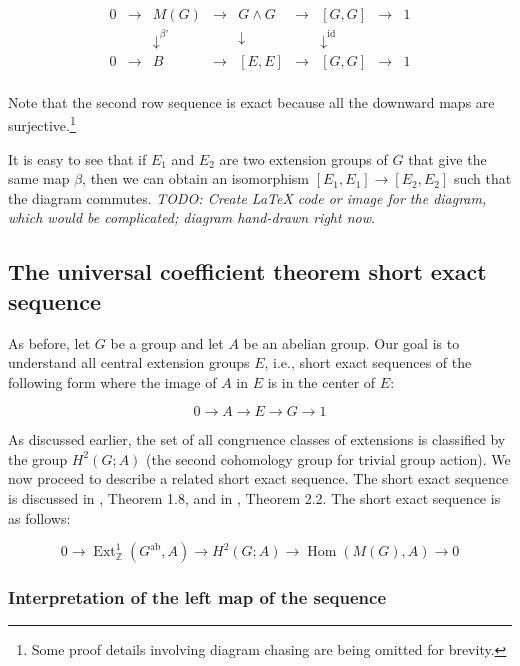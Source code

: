 \documentclass{ucetd}
\begin{document}
$$\begin{array}{ccccccccc}
0 & \to & M(G) & \to & G \wedge G & \to & [G,G] & \to & 1\\
 &&   \downarrow^{\beta'}  &&  \downarrow     && \downarrow^{\text{id}} && \\
0 & \to & B &\to & [E,E] & \to & [G,G] & \to & 1\\
\end{array}$$

Note that the second row sequence is exact because all the downward
maps are surjective.\footnote{Some proof details involving diagram
  chasing are being omitted for brevity.}

It is easy to see that if $E_1$ and $E_2$ are two
extension groups of $G$ that give the same map $\beta$, then we can
obtain an isomorphism $[E_1,E_1] \to [E_2,E_2]$ such that the diagram
commutes. {\em TODO: Create LaTeX code or image for the diagram, which
  would be complicated; diagram hand-drawn right now}.

\subsection{The universal coefficient theorem short exact sequence}\label{sec:ses-uct}

As before, let $G$ be a group and let $A$ be an abelian group. Our
goal is to understand all central extension groups $E$, i.e., short
exact sequences of the following form where the image of $A$ in $E$ is
in the center of $E$:

$$0 \to A \to E \to G \to 1$$

As discussed earlier, the set of all congruence classes of extensions
is classified by the group $H^2(G;A)$ (the second cohomology group for
trivial group action). We now proceed to describe a related short exact
sequence. The short exact sequence is discussed in
\cite{BeylIsoclinisms}, Theorem 1.8, and in
\cite{EckmannHiltonStammbach}, Theorem 2.2. The short exact sequence
is as follows:

\begin{equation}\label{eq:ses-uct}
  0 \to \operatorname{Ext}^1_{\mathbb{Z}}(G^{\operatorname{ab}},A) \to H^2(G;A) \to \operatorname{Hom}(M(G),A) \to 0
\end{equation}

\subsubsection{Interpretation of the left map of the sequence}\label{sec:ses-uct-left-map}
\end{document}
